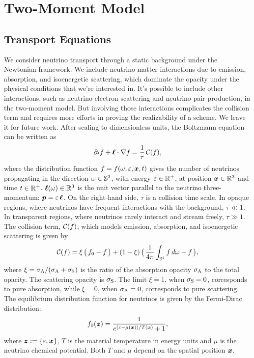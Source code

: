 \section{Two-Moment Model}\label{se:Two-MomentModel}

\subsection{Transport Equations}
We consider neutrino transport through a static background under the Newtonian framework.
We include neutrino-matter interactions due to emission, absorption, and isoenergetic scattering, which dominate the opacity under the physical conditions that we're interested in.
It's possible to include other interactions, such as neutrino-electron scattering and neutrino pair production, in the two-moment model.
But involving those interactions complicates the collision term and requires more efforts in proving the realizability of a scheme.
We leave it for future work.
After scaling to dimensionless units, the Boltzmann equation can be written as
\begin{equation}
  \pd{f}{t}+\vect{\ell}\cdot\nabla f
  =\f{1}{\tau}\,\cC(f),
  \label{eq:boltzmann}
\end{equation}
where the distribution function $f = f(\omega,\varepsilon,\boldsymbol{x},t)$ gives the number of neutrinos propagating in the direction $\omega\in\mathbb{S}^{2}$, with energy $\varepsilon\in\mathbb{R}^{+}$, at position $\boldsymbol{x}\in\mathbb{R}^{3}$ and time $t\in\mathbb{R}^{+}$.  
$\boldsymbol{\ell}(\omega)\in\mathbb{R}^{3}$ is the unit vector parallel to the neutrino three-momentum: $\boldsymbol{p}=\varepsilon\,\boldsymbol{\ell}$.
On the right-hand side, $\tau$ is a collision time scale.  
In opaque regions, where neutrinos have frequent interactions with the background, $\tau\ll1$.  
In transparent regions, where neutrinos rarely interact and stream freely, $\tau\gg1$.
The collision term, $\mathcal{C}(f)$, which models emission, absorption, and isoenergetic scattering is given by
\begin{equation}
  \cC(f)=\xi\,\big(\,f_{0}-f\,\big)
  +(1-\xi)\,\big(\,\f{1}{4\pi}\int_{\bbS^{2}}f\,d\omega-f\,\big),
  \label{eq:collisionTerm}
\end{equation}
where $\xi = \sigma_{{\rm A}} / (\sigma_{{\rm A}}  + \sigma_{{\rm S}} )$ is the ratio of the absorption opacity $\sigma_{{\rm A}}$ to the total opacity.  
The scattering opacity is $\sigma_{{\rm S}}$.  
The limit $\xi = 1$, when $\sigma_{{\rm S}} = 0$, corresponds to pure absorption, while $\xi = 0$, when $\sigma_{{\rm A}} = 0$, corresponds to pure scattering.  
The equilibrium distribution function for neutrinos is given by the Fermi-Dirac distribution:
\begin{equation}
  f_{0}(\vect{z})=\f{1}{e^{(\varepsilon-\mu(\vect{x}))/T(\vect{x})}+1}, 
  \label{eq:fermiDirac}
\end{equation}
where $\boldsymbol{z}:=\{\varepsilon,\boldsymbol{x}\}$, $T$ is the material temperature in energy units and $\mu$ is the neutrino chemical potential.
Both $T$ and $\mu$ depend on the spatial position $\boldsymbol{x}$.

